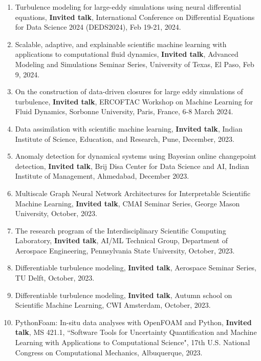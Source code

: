 \documentclass[letterpaper]{article}
\begin{document}
\begin{enumerate}
\item Turbulence modeling for large-eddy simulations using neural differential equations, \textbf{Invited talk}, International Conference on Differential Equations for Data Science 2024 (DEDS2024), Feb 19-21, 2024.

\item Scalable, adaptive, and explainable scientific machine learning with applications to computational fluid dynamics, \textbf{Invited talk}, Advanced Modeling and Simulations Seminar Series, University of Texas, El Paso, Feb 9, 2024.

\item On the construction of data-driven closures for large eddy simulations of turbulence, \textbf{Invited talk}, ERCOFTAC Workshop on Machine Learning for Fluid Dynamics, Sorbonne University, Paris, France, 6-8 March 2024.

\item Data assimilation with scientific machine learning, \textbf{Invited talk}, Indian Institute of Science, Education, and Research, Pune, December, 2023.

\item Anomaly detection for dynamical systems using Bayesian online changepoint detection, \textbf{Invited talk}, Brij Disa Center for Data Science and AI, Indian Institute of Management, Ahmedabad, December 2023.

\item Multiscale Graph Neural Network Architectures for Interpretable Scientific Machine Learning, \textbf{Invited talk}, CMAI Seminar Series, George Mason University, October, 2023.

\item The research program of the Interdisciplinary Scientific Computing Laboratory, \textbf{Invited talk}, AI/ML Technical Group, Department of Aerospace Engineering, Pennsylvania State University, October, 2023.

\item Differentiable turbulence modeling, \textbf{Invited talk}, Aerospace Seminar Series, TU Delft, October, 2023.

\item Differentiable turbulence modeling, \textbf{Invited talk}, Autumn school on Scientific Machine Learning, CWI Amsterdam, October, 2023.

\item PythonFoam: In-situ data analyses with OpenFOAM and Python, \textbf{Invited talk}, MS 421.1, ``Software Tools for Uncertainty Quantification and Machine Learning with Applications to Computational Science", 17th U.S. National Congress on Computational Mechanics, Albuquerque, 2023.


\end{enumerate}
\end{document}
